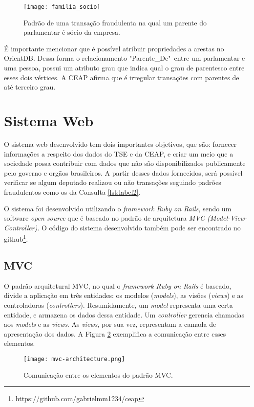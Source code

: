 \begin{figure}[H]
\centering
\texttt{[image: familia\_socio]}
\caption{Padrão de uma transação fraudulenta na qual um parente do parlamentar é sócio da empresa.}
\label{fig:familia_socio}
\end{figure}

	É importante mencionar que é possível atribuir propriedades a arestas no OrientDB. Dessa forma o relacionamento "Parente\_De"\ entre um parlamentar e uma pessoa, possui um atributo grau que indica qual o grau de parentesco entre esses dois vértices. A CEAP afirma que é irregular transações com parentes de até terceiro grau.

\section{Sistema Web}

	O sistema web desenvolvido tem dois importantes objetivos, que são: fornecer informações a respeito dos dados do TSE e da CEAP, e criar um meio que a sociedade possa contribuir com dados que não são disponibilizados publicamente pelo governo e orgãos brasileiros. A partir desses dados fornecidos, será possível verificar se algum deputado realizou ou não transações seguindo padrões fraudulentos como os da Consulta \ref{lst:label2}.
	
	O sistema foi desenvolvido utilizando o \textit{framework Ruby on Rails}, sendo um software \textit{open source} que é baseado no padrão de arquitetura \textit{MVC (Model-View-Controller)}. O código do sistema desenvolvido também pode ser encontrado no github\footnote{https://github.com/gabrielmm1234/ceap}.

\subsection{MVC} \label{mvc-subsection}

	O padrão arquitetural MVC, no qual o \textit{framework Ruby on Rails} é baseado, divide a aplicação em três entidades: os modelos (\textit{models}), as visões (\textit{views}) e as controladoras (\textit{controllers}). Resumidamente, um \textit{model} representa uma certa entidade, e armazena os dados dessa entidade. Um \textit{controller} gerencia chamadas aos \textit{models} e as \textit{views}. As \textit{views}, por sua vez, representam a camada de apresentação dos dados. A Figura \ref{fig:mvc} exemplifica a comunicação entre esses elementos.
	
\begin{figure}[H]
\centering
\texttt{[image: mvc-architecture.png]}
\caption{Comunicação entre os elementos do padrão MVC.}
\label{fig:mvc}
\end{figure}

